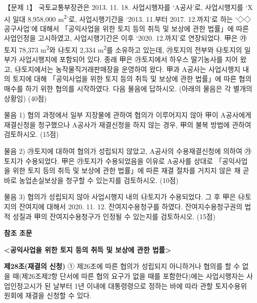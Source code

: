 \begin{longquestion}{【문제 1】}
국토교통부장관은 2013. 11. 18. 사업시행자를 ‘A공사’로, 사업시행지를 ‘X시 일대 8,958,000 m\textsuperscript{2}’로, 사업시행기간을 ‘2013. 11.부터 2017. 12.까지’로 하는 ‘◇◇공구사업’에 대해서 「공익사업을 위한 토지 등의 취득 및 보상에 관한 법률」에 따른 사업인정을 고시하였고, 사업시행기간은 이후 ‘2020. 12.까지’로 연장되었다. 甲은 ㉮토지 78,373 m\textsuperscript{2}와 ㉯토지 2,334 m\textsuperscript{2}를 소유하고 있는데, ㉮토지의 전부와 ㉯토지의 일부가 사업시행지에 포함되어 있다. 종래 甲은 ㉮토지에서 하우스 딸기농사를 지어 왔고, ㉯토지에서는 농작물직거래판매장을 운영하여 왔다. 甲과 A공사는 사업시행지 내의 토지에 대해 「공익사업을 위한 토지 등의 취득 및 보상에 관한 법률」에 따른 협의매수를 하기 위한 협의를 시작하였다. 다음 물음에 답하시오. (아래의 물음은 각 별개의 상황임) (40점) \par
\medskip\noindent 물음 1) 협의 과정에서 일부 지장물에 관하여 협의가 이루어지지 않아 甲이 A공사에게 재결신청을 청구했으나 A공사가 재결신청을 하지 않는 경우, 甲의 불복 방법에 관하여 검토하시오. (15점) \par
\medskip\noindent 물음 2) ㉮토지에 대하여 협의가 성립되지 않았고, A공사의 수용재결신청에 의하여 ㉮토지가 수용되었다. 甲은 ㉮토지가 수용되었음을 이유로 A공사를 상대로 「공익사업을 위한 토지 등의 취득 및 보상에 관한 법률」에 따른 재결 절차를 거치지 않은 채 곧바로 농업손실보상을 청구할 수 있는지를 검토하시오. (10점) \par
\medskip\noindent 물음 3) 협의가 성립되지 않아 사업시행지 내의 ㉯토지가 수용되었다. 그 후 甲은 ㉯토지의 잔여지에 대해서 2020. 11. 12. 잔여지수용청구를 하였다. 잔여지수용청구권의 법적 성질과 甲의 잔여지수용청구가 인정될 수 있는지를 검토하시오. (15점) \par
\medskip
\begin{framedtext}
\textbf{참조 조문} \par
\textbf{<공익사업을 위한 토지 등의 취득 및 보상에 관한 법률>} \par
\textbf{제28조(재결의 신청)} ① 제26조에 따른 협의가 성립되지 아니하거나 협의를 할 수 없을 때(제26조제2항 단서에 따른 협의 요구가 없을 때를 포함한다)에는 사업시행자는 사업인정고시가 된 날부터 1년 이내에 대통령령으로 정하는 바에 따라 관할 토지수용위원회에 재결을 신청할 수 있다. \par

\end{framedtext}
\end{longquestion}
